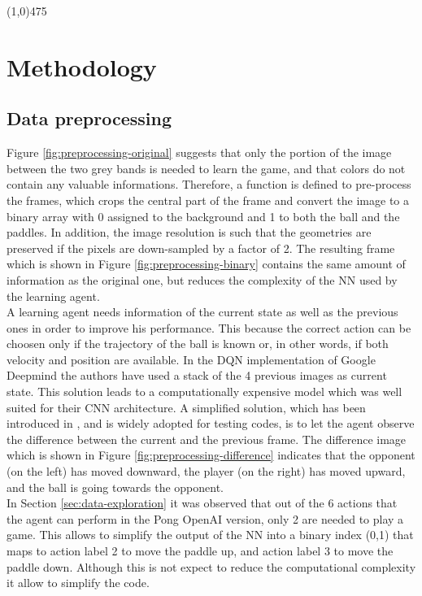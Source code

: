 \documentclass[a4paper, 11pt]{article}
\newcommand{\hl}{\begin{center} \line(1,0){475} \end{center}} %
\begin{document}
\hl

\section{Methodology}
\subsection{Data preprocessing}
Figure \ref{fig:preprocessing-original} suggests that only the portion of the image between the two grey bands is needed to learn the game, and that colors do not contain any valuable informations. Therefore, a function is defined to pre-process the frames, which crops the central part of the frame and convert the image to a binary array with 0 assigned to the background and 1 to both the ball and the paddles. In addition, the image resolution is such that the geometries are preserved if the pixels are down-sampled by a factor of 2. The resulting frame which is shown in Figure \ref{fig:preprocessing-binary} contains the same amount of information as the original one, but reduces the complexity of the NN used by the learning agent.\\
A learning agent needs information of the current state as well as the previous ones in order to improve his performance. This because the correct action can be choosen only if the trajectory of the ball is known or, in other words, if both velocity and position are available. In the DQN implementation of Google Deepmind \cite{Mnih2015} the authors have used a stack of the 4 previous images as current state. This solution leads to a computationally expensive model which was well suited for their CNN architecture. A simplified solution, which has been introduced in \cite{Karpathy}, and is widely adopted for testing codes, is to let the agent observe the difference between the current and the previous frame. The difference image which is shown in Figure \ref{fig:preprocessing-difference} indicates that the opponent (on the left) has moved downward, the player (on the right) has moved upward, and the ball is going towards the opponent.\\
In Section \ref{sec:data-exploration} it was observed that out of the 6 actions that the agent can perform in the Pong OpenAI version, only 2 are needed to play a game. This allows to simplify the output of the NN into a binary index (0,1) that maps to action label 2 to move the paddle up, and action label 3 to move the paddle down. Although this is not expect to reduce the computational complexity it allow to simplify the code.
\end{document}
